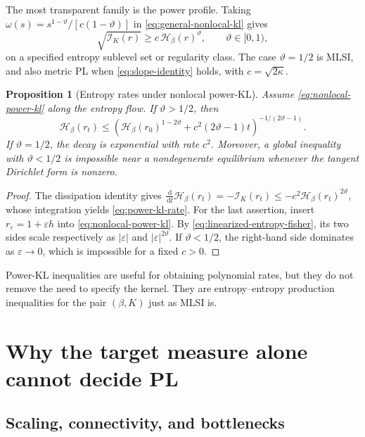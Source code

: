 \documentclass[11pt]{article}
\newtheorem{proposition}[theorem]{Proposition}
\theoremstyle{definition}
\newcommand{\dd}{\,\mathrm d}
\newcommand{\cI}{\mathcal I}
\newcommand{\cH}{\mathcal H}
\newcommand{\abs}[1]{\left\lvert #1\right\rvert}
\begin{document}
The most transparent family is the power profile.  Taking
$\omega(s)=s^{1-\vartheta}/[c(1-\vartheta)]$ in
\eqref{eq:general-nonlocal-kl} gives
\begin{equation}\label{eq:nonlocal-power-kl}
  \sqrt{\cI_K(r)}
  \geq c\,\cH_\beta(r)^\vartheta,
  \qquad \vartheta\in[0,1),
\end{equation}
on a specified entropy sublevel set or regularity class.  The case
$\vartheta=1/2$ is MLSI, and also metric PL when
\eqref{eq:slope-identity} holds, with $c=\sqrt{2\kappa}$.

\begin{proposition}[Entropy rates under nonlocal power-KL]
\label{prop:power-kl-rates}
Assume \eqref{eq:nonlocal-power-kl} along the entropy flow.  If
$\vartheta>1/2$, then
\begin{equation}\label{eq:power-kl-rate}
  \cH_\beta(r_t)
  \leq
  \left(
  \cH_\beta(r_0)^{1-2\vartheta}
  +c^2(2\vartheta-1)t
  \right)^{-1/(2\vartheta-1)}.
\end{equation}
If $\vartheta=1/2$, the decay is exponential with rate $c^2$.
Moreover, a global inequality with $\vartheta<1/2$ is impossible near a
nondegenerate equilibrium whenever the tangent Dirichlet form is nonzero.
\end{proposition}

\begin{proof}
The dissipation identity gives
$\frac{\dd}{\dd t}\cH_\beta(r_t)=-\cI_K(r_t)
\leq-c^2\cH_\beta(r_t)^{2\vartheta}$, whose integration yields
\eqref{eq:power-kl-rate}.  For the last assertion, insert
$r_\varepsilon=1+\varepsilon h$ into
\eqref{eq:nonlocal-power-kl}.  By
\eqref{eq:linearized-entropy-fisher}, its two sides scale respectively as
$\abs\varepsilon$ and $\abs\varepsilon^{2\vartheta}$.  If
$\vartheta<1/2$, the right-hand side dominates as
$\varepsilon\to0$, which is impossible for a fixed $c>0$.
\end{proof}

Power-KL inequalities are useful for obtaining polynomial rates, but they do
not remove the need to specify the kernel.  They are entropy--entropy
production inequalities for the pair $(\beta,K)$ just as MLSI is.

\section{Why the target measure alone cannot decide PL}

\subsection{Scaling, connectivity, and bottlenecks}
\end{document}
